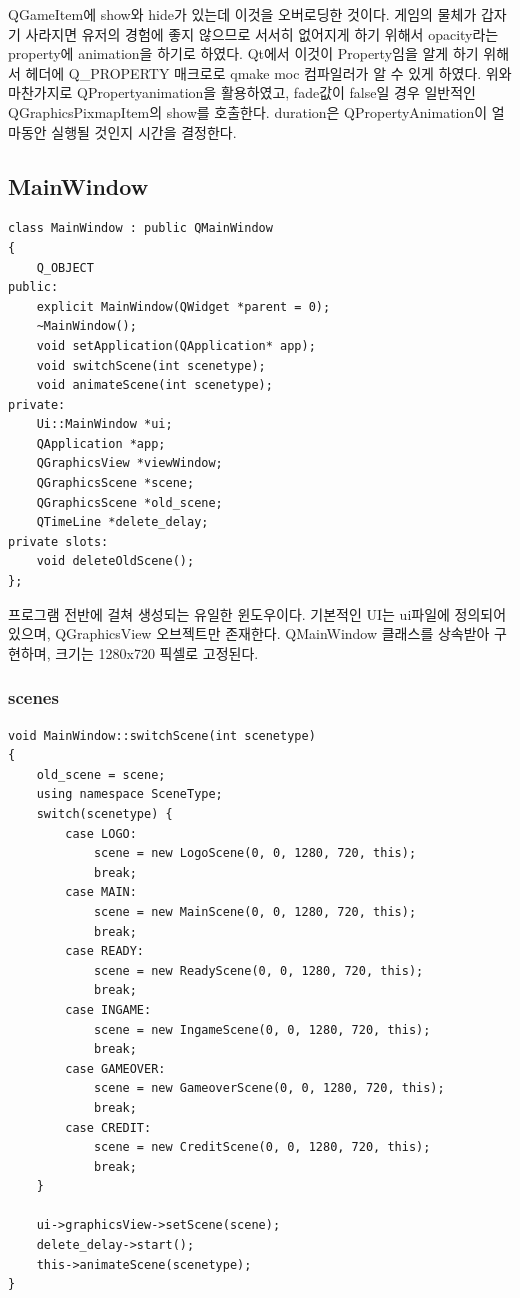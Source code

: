 \documentclass[10pt,oneside,a4paper,titlepage]{article}
\begin{document}
QGameItem에 show와 hide가 있는데 이것을 오버로딩한 것이다. 게임의 물체가 갑자기 사라지면 유저의 경험에 좋지 않으므로 서서히 없어지게 하기 위해서 opacity라는 property에 animation을 하기로 하였다.
Qt에서 이것이 Property임을 알게 하기 위해서 헤더에 Q\_PROPERTY 매크로로 qmake moc 컴파일러가 알 수 있게 하였다. 위와 마찬가지로 QPropertyanimation을 활용하였고, fade값이 false일 경우 일반적인 QGraphicsPixmapItem의 show를 호출한다. duration은 QPropertyAnimation이 얼마동안 실행될 것인지 시간을 결정한다. 

\subsection{MainWindow}

\begin{lstlisting}[caption={Mainwindow header}]
class MainWindow : public QMainWindow
{
    Q_OBJECT
public:
    explicit MainWindow(QWidget *parent = 0);
    ~MainWindow();
    void setApplication(QApplication* app);
    void switchScene(int scenetype);
    void animateScene(int scenetype);
private:
    Ui::MainWindow *ui;
    QApplication *app;
    QGraphicsView *viewWindow;
    QGraphicsScene *scene;
    QGraphicsScene *old_scene;
    QTimeLine *delete_delay;
private slots:
    void deleteOldScene();
};
\end{lstlisting}

프로그램 전반에 걸쳐 생성되는 유일한 윈도우이다. 기본적인 UI는 ui파일에 정의되어 있으며, QGraphicsView 오브젝트만 존재한다. QMainWindow 클래스를 상속받아 구현하며, 크기는 1280x720 픽셀로 고정된다.

\subsubsection{scenes}

\begin{lstlisting}[caption={MainWindow switchScene}]
void MainWindow::switchScene(int scenetype)
{
    old_scene = scene;
    using namespace SceneType;
    switch(scenetype) {
        case LOGO:
            scene = new LogoScene(0, 0, 1280, 720, this);
            break;
        case MAIN:
            scene = new MainScene(0, 0, 1280, 720, this);
            break;
        case READY:
            scene = new ReadyScene(0, 0, 1280, 720, this);
            break;
        case INGAME:
            scene = new IngameScene(0, 0, 1280, 720, this);
            break;
        case GAMEOVER:
            scene = new GameoverScene(0, 0, 1280, 720, this);
            break;
        case CREDIT:
            scene = new CreditScene(0, 0, 1280, 720, this);
            break;
    }

    ui->graphicsView->setScene(scene);
    delete_delay->start();
    this->animateScene(scenetype);
}
\end{lstlisting}
\end{document}

